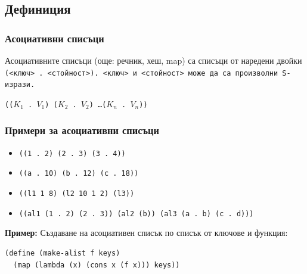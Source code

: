 \documentclass[alsotrans,beameroptions={aspectratio=169}]{beamerswitch}
\begin{document}
\subsection{Дефиниция}

\begin{frame}
  \frametitle{Асоциативни списъци}

  \begin{definition}
    Асоциативните списъци (още: речник, хеш, map) са списъци от наредени двойки \tt(<ключ> \tt. <стойност>\tt). <ключ> и <стойност> може да са произволни S-изрази.
  \end{definition}
  \vspace{2ex}
  \tt{((}$K_1$ \tt. $V_1$\tt) \tt($K_2$ \tt. $V_2$\tt) \ldots \tt($K_n$ \tt. $V_n$\tt{))}\\[2ex]
\end{frame}

\begin{frame}[fragile]
  \frametitle{Примери за асоциативни списъци}

  \begin{itemize}[<+->]
  \item \tt{((1 . 2) (2 . 3) (3 . 4))}
  \item \tt{((a . 10) (b . 12) (c . 18))}
  \item \tt{((l1 1 8) (l2 10 1 2) (l3))}
  \item \tt{((al1 (1 . 2) (2 . 3)) (al2 (b)) (al3 (a . b) (c . d)))}
  \end{itemize}
  \vspace{2ex}
  \onslide<+->
  \textbf{Пример:}
  Създаване на асоциативен списък по списък от ключове и функция:
\begin{lstlisting}
(define (make-alist f keys)
  (map (lambda (x) (cons x (f x))) keys))
\end{lstlisting}
  \onslide<+->
\end{frame}
\end{document}
